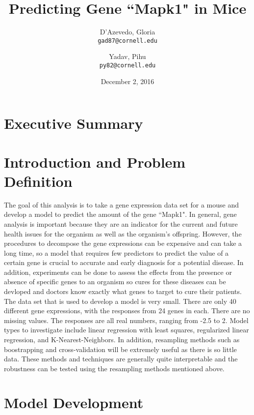 \documentclass[letterpaper]{article}
\title{Predicting Gene ``Mapk1" in Mice}
\author{
  D'Azevedo, Gloria\\
  \texttt{gad87@cornell.edu}
  \and
  Yadav, Pihu\\
  \texttt{py82@cornell.edu}
}
\date{December 2, 2016}
\begin{document}
\maketitle

\section{Executive Summary}

\section{Introduction and Problem Definition}
The goal of this analysis is to take a gene expression data set for a mouse and develop a model to predict the amount of the gene ``Mapk1".  In general, gene analysis is important because they are an indicator for the current and future health issues for the organism as well as the organism's offspring.  However, the procedures to decompose the gene expressions can be expensive and can take
a long time, so a model that requires few predictors to predict the value of a certain gene is crucial to accurate and early diagnosis 
for a potential disease.  In addition, experiments can be done to assess the effects from the presence or absence of specific genes to an organism so cures for these diseases can be devloped and doctors know exactly what genes to target to cure their patients.\\
%
The data set that is used to develop a model is very small.  There are only 40 different gene expressions, with the responses from 24 genes
in each.  There are no missing values.  The responses are all real numbers, ranging from -2.5 to 2.  Model types to investigate include linear regression with least squares, regularized linear regression, and K-Nearest-Neighbors.  In addition, resampling methods such as boostrapping and cross-validation will be extremely useful as there is so little data.  These methods and techniques are generally quite interpretable and the robustness can be tested using the resampling methods mentioned above.
%
\section{Model Development}
\end{document}

